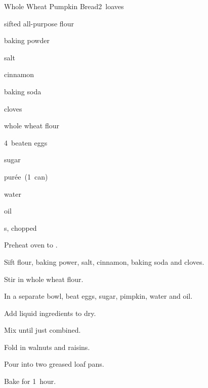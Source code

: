 \begin{recipe}{Whole Wheat Pumpkin Bread}{}{2~loaves}

\begin{ingredients}
\item {} sifted all-purpose flour
\item {} baking powder
\item \tp{1\half} salt
\item {} cinnamon
\item \tp{\twothird} baking soda
\item \tp{\half} cloves
\item \C{1\half} whole wheat flour
\item 4~beaten eggs
\item {} sugar
\item \C{2\quarter}  pur\'ee~(1~can)
\item \C{\twothird} water
\item \C{\half} oil
\item \C{\threequarter} s, chopped 
\item \C{\threequarter} 
\end{ingredients}

\begin{directions}
\item Preheat oven to .
\item Sift flour, baking power, salt, cinnamon, baking soda and cloves.
\item Stir in whole wheat flour.
\item In a separate bowl, beat eggs, sugar, pimpkin, water and oil.
\item Add liquid ingredients to dry.
\item Mix until just combined.
\item Fold in walnuts and raisins.
\item Pour into two greased loaf pans.
\item Bake for 1~hour.
\end{directions}

\end{recipe}
